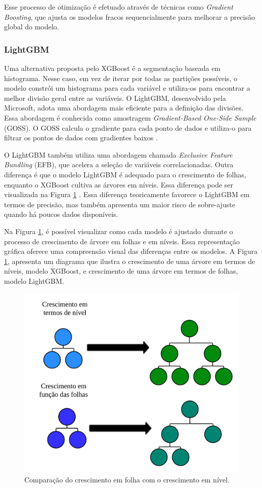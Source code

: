  Esse processo de otimização é efetuado através de técnicas como \textit{Gradient Boosting}, que ajusta os modelos fracos sequencialmente para melhorar a precisão global do modelo.
 

 
 \subsubsection{LightGBM}
 
 Uma alternativa proposta pelo XGBoost é a segmentação baseada em histograma. Nesse caso, em vez de iterar por todas as partições possíveis, o modelo constrói um histograma para cada variável e utiliza-os para encontrar a melhor divisão geral entre as variáveis. O LightGBM, desenvolvido pela Microsoft, adota uma abordagem mais eficiente para a definição das divisões. Essa abordagem é conhecida como amostragem \textit{Gradient-Based One-Side Sample} (GOSS). O GOSS calcula o gradiente para cada ponto de dados e utiliza-o para filtrar os pontos de dados com gradientes baixos \cite{SUN2020101084}. 
 
 O LightGBM também utiliza uma abordagem chamada \textit{Exclusive Feature Bundling} (EFB), que acelera a seleção de variáveis correlacionadas. 
 Outra diferença é que o modelo LightGBM é adequado para o crescimento de folhas, enquanto o XGBoost cultiva as árvores em níveis. Essa diferença pode ser visualizada na Figura \ref{fig:xgboost} \cite{YE2023407}. Essa diferença teoricamente favorece o LightGBM em termos de precisão, mas também apresenta um maior risco de sobre-ajuste quando há poucos dados disponíveis. 
 
 Na Figura \ref{fig:xgboost}, é possível visualizar como cada modelo é ajustado durante o processo de crescimento de árvore em folhas e em níveis. Essa representação gráfica oferece uma compreensão visual das diferenças entre os modelos. A Figura \ref{fig:xgboost}, apresenta um diagrama que ilustra o crescimento de uma árvore em termos de níveis, modelo XGBoost, e crescimento de uma árvore em termos de folhas, modelo LightGBM.
 
 \begin{figure}[!htb]
 	\centering
 	\caption{Comparação do crescimento em folha com o crescimento em nível.}
 	\label{fig:xgboost}
 	\includegraphics[width=0.7\linewidth]{Modelos/Figuras/xgboost.pdf}
 \end{figure}
 
